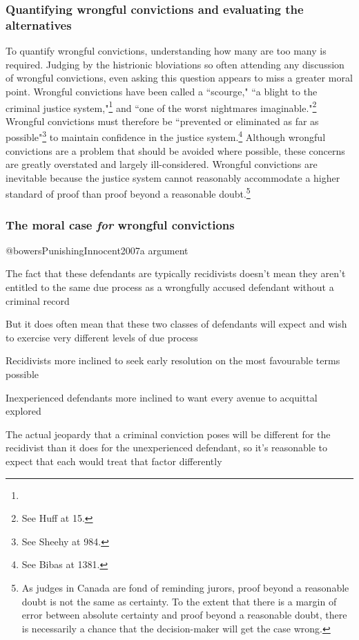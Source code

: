 \subsubsection{Quantifying wrongful convictions and evaluating the alternatives}



To quantify wrongful convictions, understanding how many are too many is required. Judging by the histrionic bloviations so often attending any discussion of wrongful convictions, even asking this question appears to miss a greater moral point. Wrongful convictions have been called a ``scourge," ``a blight to the criminal justice system,"\footnote{} and ``one of the worst nightmares imaginable."\footnote{See Huff at 15.} Wrongful convictions must therefore be ``prevented or eliminated as far as possible"\footnote{See Sheehy at 984.} to maintain confidence in the justice system.\footnote{See Bibas at 1381.} Although wrongful convictions are a problem that should be avoided where possible, these concerns are greatly overstated and largely ill-considered. Wrongful convictions are inevitable because the justice system cannot reasonably accommodate a higher standard of proof than proof beyond a reasonable doubt.\footnote{As judges in Canada are fond of reminding jurors, proof beyond a reasonable doubt is not the same as certainty. To the extent that there is a margin of error between absolute certainty and proof beyond a reasonable doubt, there is necessarily a chance that the decision-maker will get the case wrong.} 

\subsubsection{The moral case \textit{for} wrongful convictions}

@bowersPunishingInnocent2007a argument

The fact that these defendants are typically recidivists doesn't mean they aren't entitled to the same due process as a wrongfully accused defendant without a criminal record

But it does often mean that these two classes of defendants will expect and wish to exercise very different levels of due process

Recidivists more inclined to seek early resolution on the most favourable terms possible

Inexperienced defendants more inclined to want every avenue to acquittal explored

The actual jeopardy that a criminal conviction poses will be different for the recidivist than it does for the unexperienced defendant, so it's reasonable to expect that each would treat that factor differently

